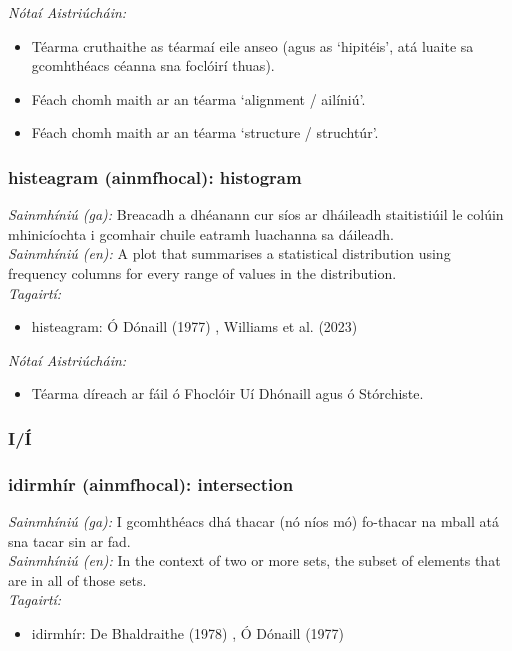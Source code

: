  \noindent \textit{Nótaí Aistriúcháin:}
\begin{itemize}
	\item Téarma cruthaithe as téarmaí eile anseo (agus as `hipitéis', atá luaite sa gcomhthéacs céanna sna foclóirí thuas).
	\item Féach chomh maith ar an téarma `alignment / ailíniú'.
	\item Féach chomh maith ar an téarma `structure / struchtúr'.
\end{itemize}


\subsubsection*{histeagram (ainmfhocal): histogram}
 \noindent \textit{Sainmhíniú (ga):} Breacadh a dhéanann cur síos ar dháileadh staitistiúil le colúin mhinicíochta i gcomhair chuile eatramh luachanna sa dáileadh.
\\
 \noindent \textit{Sainmhíniú (en):} A plot that summarises a statistical distribution using frequency columns for every range of values in the distribution.
\\
 \noindent \textit{Tagairtí:}
\begin{itemize}
	\item histeagram: Ó Dónaill (1977) \cite{odonaill}, Williams et al. (2023) \cite{storchiste}
\end{itemize}

 \noindent \textit{Nótaí Aistriúcháin:}
\begin{itemize}
	\item Téarma díreach ar fáil ó Fhoclóir Uí Dhónaill agus ó Stórchiste.
\end{itemize}


 \subsubsection*{I/Í}

\subsubsection*{idirmhír (ainmfhocal): intersection}
 \noindent \textit{Sainmhíniú (ga):} I gcomhthéacs dhá thacar (nó níos mó) fo-thacar na mball atá sna tacar sin ar fad.
\\
 \noindent \textit{Sainmhíniú (en):} In the context of two or more sets, the subset of elements that are in all of those sets.
\\
 \noindent \textit{Tagairtí:}
\begin{itemize}
	\item idirmhír: De Bhaldraithe (1978) \cite{de-bhaldraithe}, Ó Dónaill (1977) \cite{odonaill}
\end{itemize}

